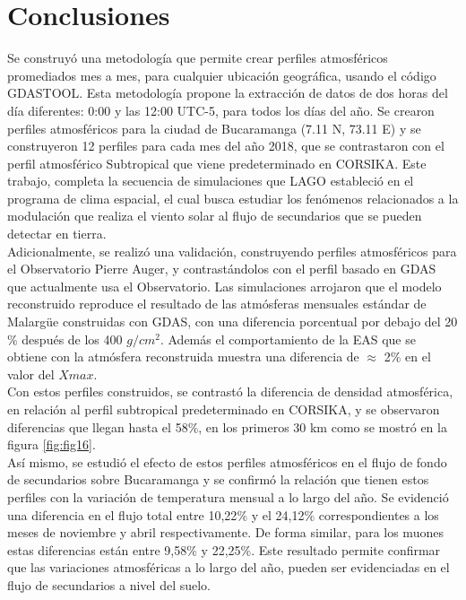 \newpage
\chapter{Conclusiones}


\noindent Se construyó una metodología que permite crear perfiles atmosféricos promediados mes a mes, para cualquier ubicación geográfica, usando el código GDASTOOL. Esta metodología propone la extracción de datos de dos horas del día diferentes: 0:00 y las 12:00 UTC-5, para todos los días del año. Se crearon perfiles atmosféricos para la ciudad de Bucaramanga (7.11 N, 73.11 E) y se construyeron 12 perfiles para cada mes del año 2018, que se contrastaron con el perfil atmosférico Subtropical que viene predeterminado en CORSIKA. Este trabajo, completa la secuencia de simulaciones que LAGO estableció en el programa de clima espacial, el cual busca estudiar los fenómenos relacionados a la  modulación que realiza el viento solar al flujo de secundarios que se pueden detectar en tierra.\\

Adicionalmente, se realizó una validación, construyendo perfiles atmosféricos para el Observatorio Pierre Auger, y contrastándolos con el perfil basado en GDAS que actualmente usa el Observatorio. Las simulaciones arrojaron que el modelo reconstruido reproduce el resultado de las atmósferas mensuales estándar de Malarg\"ue construidas con GDAS, con una diferencia porcentual por debajo del 20$\%$ después de los 400 $g/cm^{2}$. Además el comportamiento de la EAS que se obtiene con la atmósfera reconstruida muestra una diferencia de $\approx$ 2$\%$ en el valor del $X{max}$.\\

Con estos perfiles construidos, se contrastó la diferencia de  densidad atmosférica, en relación al perfil subtropical predeterminado en CORSIKA, y se observaron diferencias que llegan hasta el 58$\%$, en los primeros 30 km como se mostró en la figura \ref{fig:fig16}.\\

Así mismo, se estudió el efecto de estos perfiles atmosféricos en el flujo de fondo de secundarios sobre Bucaramanga y se confirmó la relación que tienen estos perfiles con la variación de temperatura mensual a lo largo del año. Se evidenció una diferencia en el flujo total entre 10,22$\%$ y el 24,12$\%$ correspondientes a los meses de noviembre y abril respectivamente. De forma similar, para los muones estas diferencias están entre 9,58$\%$ y 22,25$\%$. Este resultado permite confirmar que las variaciones atmosféricas a lo largo del año, pueden ser evidenciadas en el flujo de secundarios a nivel del suelo.\\

